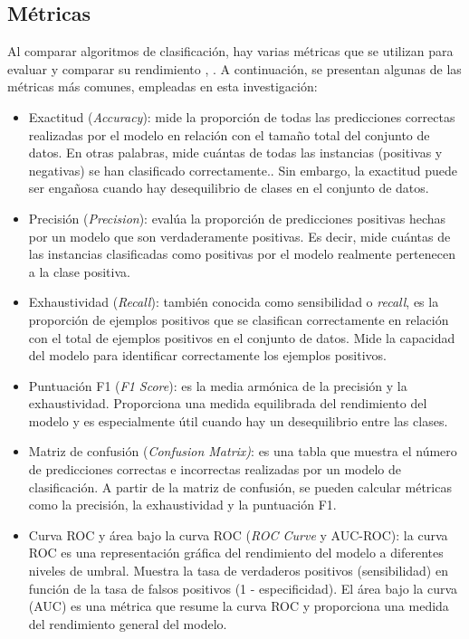 \subsection{Métricas}
Al comparar algoritmos de clasificación, hay varias métricas que se utilizan para evaluar y comparar su rendimiento \citep{geron2022hands}, \citep{hastie2009elements}. A continuación, se presentan algunas de las métricas más comunes, empleadas en esta investigación:
\begin{itemize}
	\item Exactitud (\textit{Accuracy}): mide la proporción de todas las predicciones correctas realizadas por el modelo en relación con el tamaño total del conjunto de datos. En otras palabras, mide cuántas de todas las instancias (positivas y negativas) se han clasificado correctamente.. Sin embargo, la exactitud puede ser engañosa cuando hay desequilibrio de clases en el conjunto de datos.
	\item Precisión (\textit{Precision}): evalúa la proporción de predicciones positivas hechas por un modelo que son verdaderamente positivas. Es decir, mide cuántas de las instancias clasificadas como positivas por el modelo realmente pertenecen a la clase positiva. 
	\item Exhaustividad (\textit{Recall}): también conocida como sensibilidad o \textit{recall}, es la proporción de ejemplos positivos que se clasifican correctamente en relación con el total de ejemplos positivos en el conjunto de datos. Mide la capacidad del modelo para identificar correctamente los ejemplos positivos.
	\item Puntuación F1 (\textit{F1 Score}): es la media armónica de la precisión y la exhaustividad. Proporciona una medida equilibrada del rendimiento del modelo y es especialmente útil cuando hay un desequilibrio entre las clases.
	\item Matriz de confusión (\textit{Confusion Matrix)}: es una tabla que muestra el número de predicciones correctas e incorrectas realizadas por un modelo de clasificación. A partir de la matriz de confusión, se pueden calcular métricas como la precisión, la exhaustividad y la puntuación F1.
	\item Curva ROC y área bajo la curva ROC (\textit{ROC Curve} y AUC-ROC): la curva ROC es una representación gráfica del rendimiento del modelo a diferentes niveles de umbral. Muestra la tasa de verdaderos positivos (sensibilidad) en función de la tasa de falsos positivos (1 - especificidad). El área bajo la curva (AUC) es una métrica que resume la curva ROC y proporciona una medida del rendimiento general del modelo.
\end{itemize}

